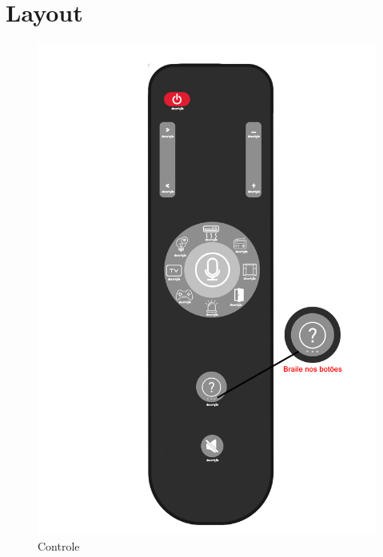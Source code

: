 \documentclass[12pt,a4paper]{article} \usepackage[utf8]{inputenc}
\begin{document}
\section{Layout}
\begin{figure}[htb!]
	\centering
	\includegraphics[width=14cm]{controle}
	\caption{Controle}
	\label{fig:controle}
\end{figure}
\end{document}
